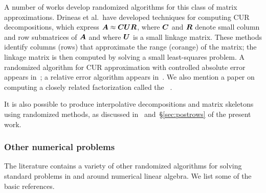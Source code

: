 \documentclass[final]{siamltex}
\newcounter{algorithm}[section]
\begin{document}
A number of works develop randomized algorithms for this class
of matrix approximations.
Drineas et al.~have developed techniques for computing CUR decompositions,
which express $\bm{A} \approx \bm{CUR}$, where $\bm{C}$ and $\bm{R}$ denote
small column and row submatrices of $\bm{A}$ and where $\bm{U}$ is
a small linkage matrix. These methods identify columns (rows) that
approximate the range (corange) of the matrix; the linkage matrix is
then computed by solving a small least-squares problem. A randomized
algorithm for CUR approximation with controlled absolute error
appears in~\cite{DKM06:Fast-Monte-Carlo-III}; a relative error
algorithm appears in~\cite{DMM08:Relative-Error}.
We also mention a paper on computing a closely related factorization
called the ~\cite{SXZF08:Less-Is-More}.

It is also possible to produce interpolative decompositions and matrix
skeletons using randomized methods, as discussed in~\cite{random1,tygert_szlam}
and~\S\ref{sec:postrows} of the present work.

\subsubsection{Other numerical problems}

The literature contains a variety of other randomized algorithms for solving
standard problems in and around numerical linear algebra.  We list some of
the basic references.

\lsp
\end{document}
